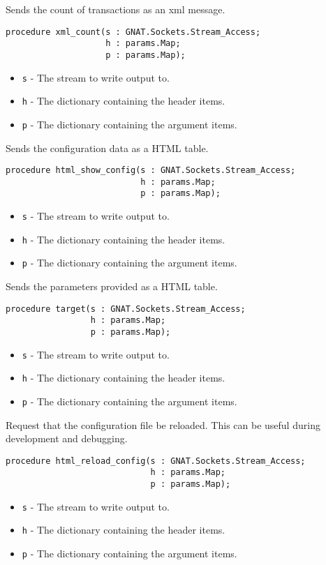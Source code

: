 \documentclass[10pt, openany]{book}
\newcommand{\keyword}[1]{\texttt{#1}}
\begin{document}
Sends the count of transactions as an xml message.
\begin{lstlisting}
procedure xml_count(s : GNAT.Sockets.Stream_Access;
                    h : params.Map;
                    p : params.Map);
\end{lstlisting}
\begin{itemize}
  \item \keyword{s} - The stream to write output to.
  \item \keyword{h} - The dictionary containing the header items.
  \item \keyword{p} - The dictionary containing the argument items.
\end{itemize}
Sends the configuration data as a HTML table.
\begin{lstlisting}
procedure html_show_config(s : GNAT.Sockets.Stream_Access;
                           h : params.Map;
                           p : params.Map);
\end{lstlisting}
\begin{itemize}
  \item \keyword{s} - The stream to write output to.
  \item \keyword{h} - The dictionary containing the header items.
  \item \keyword{p} - The dictionary containing the argument items.
\end{itemize}
Sends the parameters provided as a HTML table.
\begin{lstlisting}
procedure target(s : GNAT.Sockets.Stream_Access;
                 h : params.Map;
                 p : params.Map);
\end{lstlisting}
\begin{itemize}
  \item \keyword{s} - The stream to write output to.
  \item \keyword{h} - The dictionary containing the header items.
  \item \keyword{p} - The dictionary containing the argument items.
\end{itemize}
Request that the configuration file be reloaded.  This can be useful during development and debugging.
\begin{lstlisting}
procedure html_reload_config(s : GNAT.Sockets.Stream_Access;
                             h : params.Map;
                             p : params.Map);
\end{lstlisting}
\begin{itemize}
  \item \keyword{s} - The stream to write output to.
  \item \keyword{h} - The dictionary containing the header items.
  \item \keyword{p} - The dictionary containing the argument items.
\end{itemize}
\end{document}
